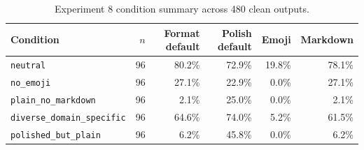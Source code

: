 \begin{table}[t]
\centering
\caption{Experiment 8 condition summary across 480 clean outputs.}
\label{tab:exp8-condition-summary}
\begin{tabular}{lrrrrr}
\toprule
Condition & $n$ & Format default & Polish default & Emoji & Markdown \\
\midrule
\texttt{neutral} & 96 & 80.2\% & 72.9\% & 19.8\% & 78.1\% \\
\texttt{no\_emoji} & 96 & 27.1\% & 22.9\% & 0.0\% & 27.1\% \\
\texttt{plain\_no\_markdown} & 96 & 2.1\% & 25.0\% & 0.0\% & 2.1\% \\
\texttt{diverse\_domain\_specific} & 96 & 64.6\% & 74.0\% & 5.2\% & 61.5\% \\
\texttt{polished\_but\_plain} & 96 & 6.2\% & 45.8\% & 0.0\% & 6.2\% \\
\bottomrule
\end{tabular}
\end{table}
